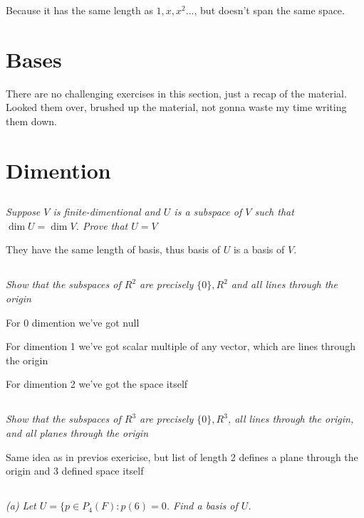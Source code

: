 \documentclass[11pt,oneside,titlepage]{book}
\begin{document}
Because it has the same length as $1, x, x^2 ... $, but doesn't span the same
space.

\section{Bases}

There are no challenging exercises in this section, just a recap of
the material. Looked them over, brushed up the material, not gonna waste
my time writing them down.

\section{Dimention}

\subsection{}
\textit{Suppose $V$ is finite-dimentional and $U$ is a subspace of $V$ such
  that $\dim U = \dim V$. Prove that $U = V$}

They have the same length of basis, thus basis of $U$ is a basis of $V$.

\subsection{}
\textit{Show that the subspaces of $R^2$ are precisely $\{0\}, R^2$ and all
  lines through the origin}

For 0 dimention we've got null

For dimention 1 we've got scalar multiple of any vector, which are lines
through the origin

For dimention 2 we've got the space itself

\subsection{}
\textit{Show that the subspaces of $R^3$ are precisely $\{0\}, R^3$, all
  lines through the origin, and all planes through the origin}

Same idea as in previos exericise, but list of length 2 defines a plane
through the origin and 3 defined space itself

\subsection{}
\textit{(a) Let $U = \{p \in P_4(F): p(6) = 0$. Find a basis of $U$.}
\end{document}
